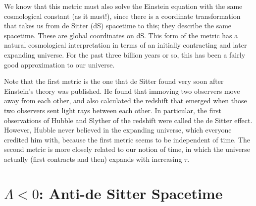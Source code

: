 We know that this metric must also solve the Einstein equation with the same cosmological constant (as it must!), since there is a coordinate transformation that takes us from de Sitter (dS) spacetime to this; they describe the same spacetime.
These are global coordinates on dS.
This form of the metric has a natural cosmological interpretation in terms of an initially contracting and later expanding universe.
For the past three billion years or so, this has been a fairly good approximation to our universe.
\begin{leftbar}
  \begin{remark}
    Note that the first metric is the one that de Sitter found very soon after Einstein's theory was published.
    He found that immoving two observers move away from each other, and also calculated the redshift that emerged when those two observers sent light rays between each other.
    In particular, the first observations of Hubble and Slyther of the redshift were called the de Sitter effect.
    However, Hubble never believed in the expanding universe, which everyone credited him with, because the first metric seems to be independent of time.
    The second metric is more closely related to our notion of time, in which the universe actually (first contracts and then) expands with increasing $\tau$.
  \end{remark}
\end{leftbar}

\section{\texorpdfstring{$\Lambda < 0$}{Negative Cosmological Constant}: Anti-de Sitter Spacetime}%
\label{sec:anti_de_sitter_spacetime}

